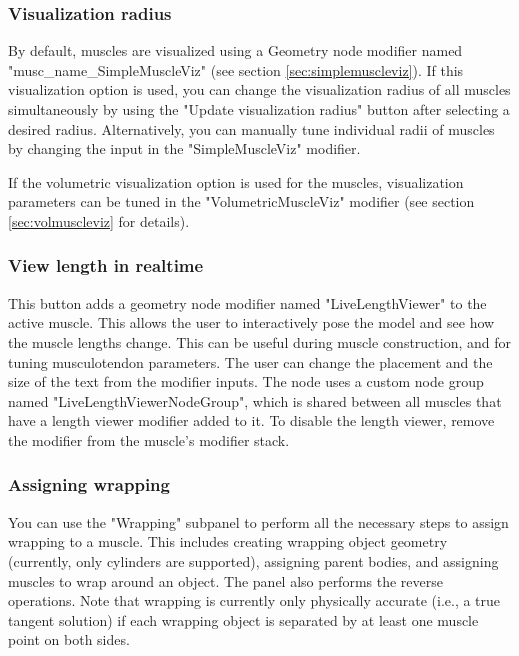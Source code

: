 \documentclass{article}
\begin{document}
\subsubsection{Visualization radius}
By default, muscles are visualized using a Geometry node modifier named "musc\_name\_SimpleMuscleViz" (see section \ref{sec:simplemuscleviz}). If this visualization option is used, you can change the visualization radius of all muscles simultaneously by using the "Update visualization radius" button after selecting a desired radius. Alternatively, you can manually tune individual radii of muscles by changing the input in the "SimpleMuscleViz" modifier.

If the volumetric visualization option is used for the muscles, visualization parameters can be tuned in the "VolumetricMuscleViz" modifier (see section \ref{sec:volmuscleviz} for details).

\subsubsection{View length in realtime}

This button adds a geometry node modifier named "LiveLengthViewer" to the active muscle. This allows the user to interactively pose the model and see how the muscle lengths change. This can be useful during muscle construction, and for tuning musculotendon parameters. The user can change the placement and the size of the text from the modifier inputs. %
The node uses a custom node group named "LiveLengthViewerNodeGroup", which is shared between all muscles that have a length viewer modifier added to it. To disable the length viewer, remove the modifier from the muscle's modifier stack.


\subsubsection{Assigning wrapping}

You can use the "Wrapping" subpanel to perform all the necessary steps to assign wrapping to a muscle. This includes creating wrapping object geometry (currently, only cylinders are supported), assigning parent bodies, and assigning muscles to wrap around an object. The panel also performs the reverse operations. Note that wrapping is currently only physically accurate (i.e., a true tangent solution) if each wrapping object is separated by at least one muscle point on both sides.
\end{document}

